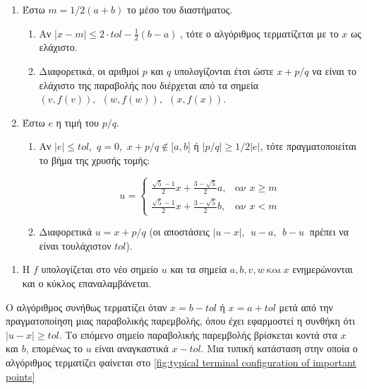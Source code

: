 \begin{enumerate} 
  \def\labelenumi{\arabic{enumi}.} 
  \item Έστω $m = 1\text{/}2(a + b)$ το μέσο του διαστήματος.

  \begin{enumerate} \def\labelenumii{\alph{enumii}.} 
      \item Αν $|x - m| \leq 2 \cdot tol - \frac{1}{2}(b - a)\ $, τότε ο αλγόριθμος τερματίζεται με το $x$ ως ελάχιστο. 
      \item Διαφορετικά, οι αριθμοί $p$ και $q$ υπολογίζονται έτσι ώστε $x + p/q$ να είναι το ελάχιστο της παραβολής που διέρχεται από τα σημεία\\ $\left( v,f(v) \right),\ \ \left( w,f(w) \right),\ \ \left( x,f(x) \right)$. 
  \end{enumerate} 

  \item Έστω $e$ η τιμή του $p/q$.
  
  \begin{enumerate} \def\labelenumii{\alph{enumii}.} 
    \item Αν $|e| \leq tol$,\ $q = 0$,\ $x + p\text{/}q \notin \lbrack a,b\rbrack$ ή $\left| p\text{/}q \right| \geq 1/2|e|$, τότε πραγματοποιείται το βήμα της χρυσής τομής:
  
    \begin{equation} u = \begin{cases} \frac{\sqrt{5} - 1}{2}x + \frac{3 - \sqrt{5}}{2}a, & \text{αν } x \geq m \\ \frac{\sqrt{5} - 1}{2}x + \frac{3 - \sqrt{5}}{2}b, & \text{αν } x < m \end{cases} \end{equation}
  
    \item Διαφορετικά $u = x + p\text{/}q$ (οι αποστάσεις $|u - x|,\ \ u - a,\ \ b - u\ $ πρέπει να είναι τουλάχιστον $tol$). 
  \end{enumerate}
\end{enumerate}


\begin{enumerate}
  \def\labelenumi{\arabic{enumi}.}
  \setcounter{enumi}{2}
  \item
    Η $f$ υπολογίζεται στο νέο σημείο $u$ και τα σημεία
    $a,b,v,w\ \text{και}\ x$ ενημερώνονται και ο κύκλος επαναλαμβάνεται.
  \end{enumerate}

  Ο αλγόριθμος συνήθως τερματίζει όταν $x = b - tol$ ή
  $x = a + tol$ μετά από την πραγματοποίηση μιας παραβολικής παρεμβολής, όπου
  έχει εφαρμοστεί η συνθήκη ότι $|u - x| \geq tol$. Το επόμενο
  σημείο παραβολικής παρεμβολής βρίσκεται κοντά στα $x$ και $b$, επομένως το $u$ είναι αναγκαστικά
  $x - tol$. Μια τυπική κατάσταση στην οποία ο αλγόριθμος τερματίζει φαίνεται στο \autoref{fig:typical terminal configuration of important points}

